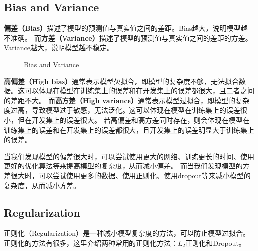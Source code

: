 \subsection{Bias and Variance}
\textbf{偏差（Bias）}描述了模型的预测值与真实值之间的差距。Bias越大，说明模型越不准确。
而\textbf{方差（Variance）}描述了模型的预测值与真实值之间的差距的方差。Variance越大，说明模型越不稳定。

\begin{figure}[h!bt]
    \centering
    \centering
    \caption{Bias and Variance}
    \label{fig:bias-variance}
\end{figure}

\textbf{高偏差（High bias）}通常表示模型欠拟合，即模型的复杂度不够，无法拟合数据。这可以体现在模型在训练集上的误差和在开发集上的误差都很大，且二者之间的差距不大。
而\textbf{高方差（High variance）}通常表示模型过拟合，即模型的复杂度过高，导致模型过于敏感，无法泛化。这可以体现在模型在训练集上的误差很小，但在开发集上的误差很大。
若高偏差和高方差同时存在，则会体现在模型在训练集上的误差和在开发集上的误差都很大，且开发集上的误差明显大于训练集上的误差。

当我们发现模型的偏差很大时，可以尝试使用更大的网络、训练更长的时间、使用更好的优化算法等来提高模型的复杂度，从而减小偏差。
而当我们发现模型的方差很大时，可以尝试使用更多的数据、使用正则化、使用dropout等来减小模型的复杂度，从而减小方差。

\subsection{Regularization}

正则化（Regularization）是一种减小模型复杂度的方法，可以防止模型过拟合。
正则化的方法有很多，这里介绍两种常用的正则化方法：$L_2$正则化和Dropout。

